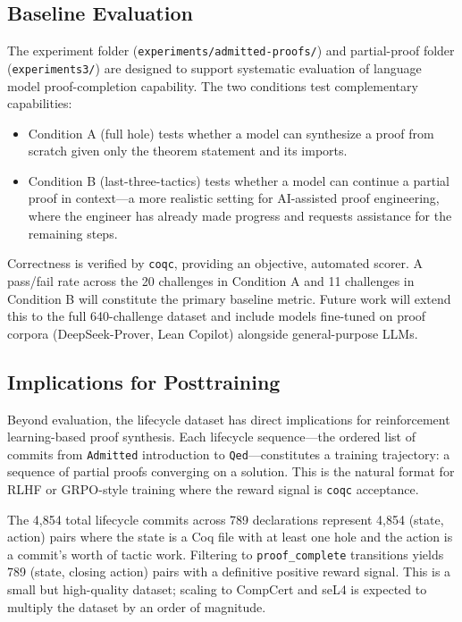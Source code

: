\documentclass[11pt]{article}
\begin{document}
\subsection{Baseline Evaluation}

The experiment folder (\texttt{experiments/admitted-proofs/}) and partial-proof folder (\texttt{experiments3/}) are designed to support systematic evaluation of language model proof-completion capability. The two conditions test complementary capabilities:

\begin{itemize}
  \item Condition A (full hole) tests whether a model can synthesize a proof from scratch given only the theorem statement and its imports.
  \item Condition B (last-three-tactics) tests whether a model can continue a partial proof in context---a more realistic setting for AI-assisted proof engineering, where the engineer has already made progress and requests assistance for the remaining steps.
\end{itemize}

Correctness is verified by \texttt{coqc}, providing an objective, automated scorer. A pass/fail rate across the 20 challenges in Condition A and 11 challenges in Condition B will constitute the primary baseline metric. Future work will extend this to the full 640-challenge dataset and include models fine-tuned on proof corpora (DeepSeek-Prover, Lean Copilot) alongside general-purpose LLMs.

\subsection{Implications for Posttraining}

Beyond evaluation, the lifecycle dataset has direct implications for reinforcement learning-based proof synthesis. Each lifecycle sequence---the ordered list of commits from \texttt{Admitted} introduction to \texttt{Qed}---constitutes a training trajectory: a sequence of partial proofs converging on a solution. This is the natural format for RLHF or GRPO-style training where the reward signal is \texttt{coqc} acceptance.

The 4,854 total lifecycle commits across 789 declarations represent 4,854 (state, action) pairs where the state is a Coq file with at least one hole and the action is a commit's worth of tactic work. Filtering to \texttt{proof\_complete} transitions yields 789 (state, closing action) pairs with a definitive positive reward signal. This is a small but high-quality dataset; scaling to CompCert and seL4 is expected to multiply the dataset by an order of magnitude.
\end{document}
